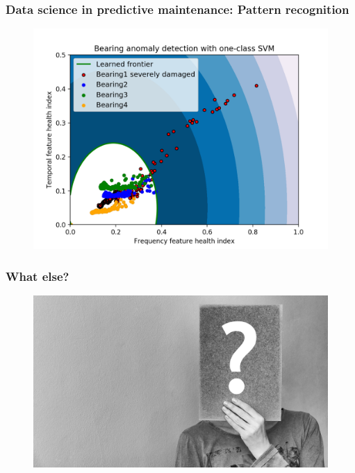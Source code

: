 \documentclass{beamer}
\begin{document}
\begin{frame}
	\frametitle{Data science in predictive maintenance: Pattern recognition}
	\begin{figure}[H]
		\centering
		\includegraphics[width=0.5\linewidth]{svm}
	\end{figure}
\end{frame}

\begin{frame}
		\frametitle{What else?}
			\begin{figure}[H]
			\centering
			\includegraphics[width=0.7\linewidth]{question}
				\end{figure}
		
\end{frame}
\end{document}
